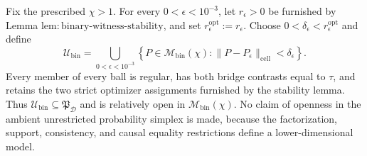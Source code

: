 Fix the prescribed \(\chi>1\). For every \(0<\epsilon<10^{-3}\), let \(r_\epsilon>0\) be furnished by Lemma \(\mathrm{lem{:}binary\text{-}witness\text{-}stability}\), and set \(r_\epsilon^{\mathrm{opt}}:=r_\epsilon\). Choose \(0<\delta_\epsilon<r_\epsilon^{\mathrm{opt}}\) and define
\[
 \mathcal U_{\mathrm{bin}}
 =\bigcup_{0<\epsilon<10^{-3}}
 \left\{P\in\mathcal M_{\mathrm{bin}}(\chi):
 \|P-P_\epsilon\|_{\mathrm{cell}}<\delta_\epsilon\right\}. \tag{1}
\]
Every member of every ball is regular, has both bridge contrasts equal to \(\tau\), and retains the two strict optimizer assignments furnished by the stability lemma. Thus \(\mathcal U_{\mathrm{bin}}\subseteq\mathfrak P_{\mathcal D}\) and is relatively open in \(\mathcal M_{\mathrm{bin}}(\chi)\). No claim of openness in the ambient unrestricted probability simplex is made, because the factorization, support, consistency, and causal equality restrictions define a lower-dimensional model.